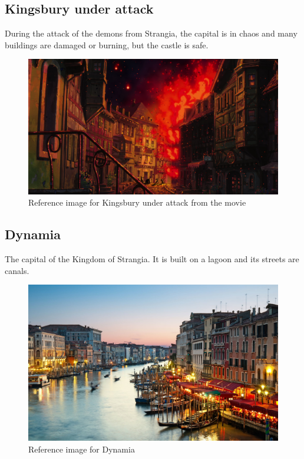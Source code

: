 \subsection{Kingsbury under attack}
During the attack of the demons from Strangia, the capital is in chaos and many buildings are damaged or burning, but the castle is safe.
\begin{figure}[H]
  \centering
  \includegraphics[width=12cm]{../Images/Locations/kingsburyUnderAttack}
  \caption{Reference image for Kingsbury under attack from the movie}
\end{figure}

\subsection{Dynamia}
The capital of the Kingdom of Strangia. It is built on a lagoon and its streets are canals.
\begin{figure}[H]
  \centering
  \includegraphics[width=12cm]{../Images/Locations/dynamia}
  \caption{Reference image for Dynamia}
\end{figure}


